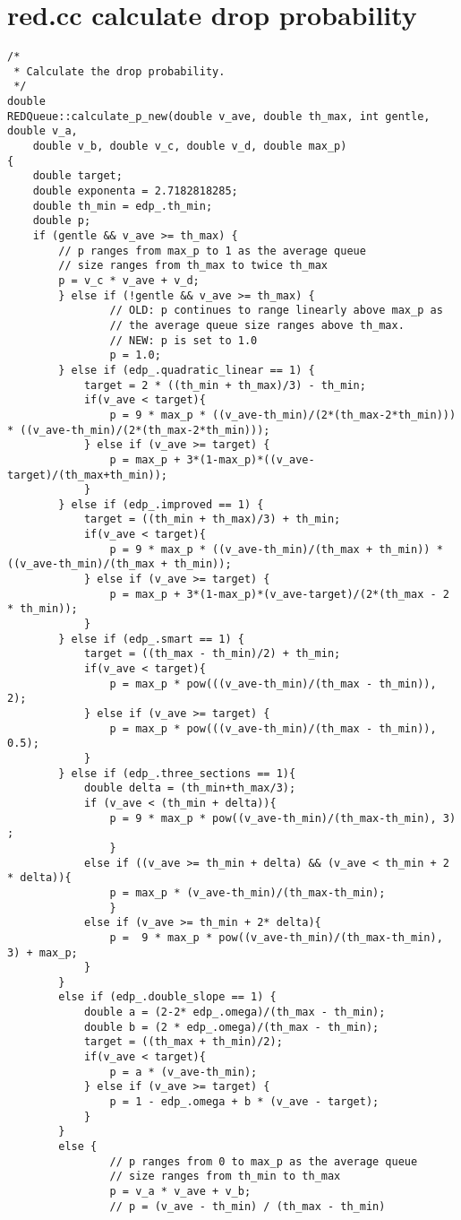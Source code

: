 \section*{red.cc calculate drop probability}

\begin{verbatim}
/*
 * Calculate the drop probability.
 */
double
REDQueue::calculate_p_new(double v_ave, double th_max, int gentle, double v_a, 
	double v_b, double v_c, double v_d, double max_p)
{	
	double target;
	double exponenta = 2.7182818285;
	double th_min = edp_.th_min;
	double p;
	if (gentle && v_ave >= th_max) {
		// p ranges from max_p to 1 as the average queue
		// size ranges from th_max to twice th_max 
		p = v_c * v_ave + v_d;
        } else if (!gentle && v_ave >= th_max) { 
                // OLD: p continues to range linearly above max_p as
                // the average queue size ranges above th_max.
                // NEW: p is set to 1.0 
                p = 1.0;
        } else if (edp_.quadratic_linear == 1) {
        	target = 2 * ((th_min + th_max)/3) - th_min;
        	if(v_ave < target){
        		p = 9 * max_p * ((v_ave-th_min)/(2*(th_max-2*th_min))) * ((v_ave-th_min)/(2*(th_max-2*th_min)));
        	} else if (v_ave >= target) {
        		p = max_p + 3*(1-max_p)*((v_ave-target)/(th_max+th_min));
        	}
        } else if (edp_.improved == 1) {
        	target = ((th_min + th_max)/3) + th_min;
        	if(v_ave < target){
        		p = 9 * max_p * ((v_ave-th_min)/(th_max + th_min)) * ((v_ave-th_min)/(th_max + th_min));
        	} else if (v_ave >= target) {
        		p = max_p + 3*(1-max_p)*(v_ave-target)/(2*(th_max - 2 * th_min));
        	}
        } else if (edp_.smart == 1) {
        	target = ((th_max - th_min)/2) + th_min;
        	if(v_ave < target){
        		p = max_p * pow(((v_ave-th_min)/(th_max - th_min)), 2);
        	} else if (v_ave >= target) {
        		p = max_p * pow(((v_ave-th_min)/(th_max - th_min)), 0.5);
        	}
        } else if (edp_.three_sections == 1){
        	double delta = (th_min+th_max/3);
        	if (v_ave < (th_min + delta)){
        		p = 9 * max_p * pow((v_ave-th_min)/(th_max-th_min), 3) ;
        		}
        	else if ((v_ave >= th_min + delta) && (v_ave < th_min + 2 * delta)){
        		p = max_p * (v_ave-th_min)/(th_max-th_min);
        		}
        	else if (v_ave >= th_min + 2* delta){
        		p =  9 * max_p * pow((v_ave-th_min)/(th_max-th_min), 3) + max_p;
        	} 
        }
        else if (edp_.double_slope == 1) {
        	double a = (2-2* edp_.omega)/(th_max - th_min);
        	double b = (2 * edp_.omega)/(th_max - th_min);
        	target = ((th_max + th_min)/2);
        	if(v_ave < target){
        		p = a * (v_ave-th_min);
        	} else if (v_ave >= target) {
        		p = 1 - edp_.omega + b * (v_ave - target);
        	}
        }
        else {
                // p ranges from 0 to max_p as the average queue
                // size ranges from th_min to th_max 
                p = v_a * v_ave + v_b;
                // p = (v_ave - th_min) / (th_max - th_min)
                

\end{verbatim}
